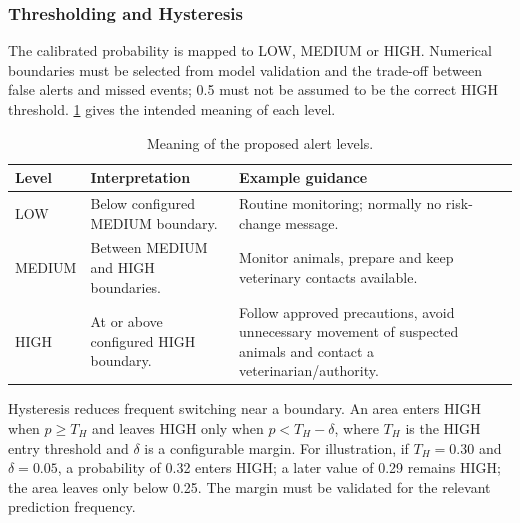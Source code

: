 \documentclass[10pt,openany]{report}
\begin{document}
\subsubsection{Thresholding and Hysteresis}
The calibrated probability is mapped to LOW, MEDIUM or HIGH. Numerical boundaries must be selected from model validation and the trade-off between false alerts and missed events; 0.5 must not be assumed to be the correct HIGH threshold. \cref{tab:alert-levels} gives the intended meaning of each level.
\begin{table}[htbp]\centering\small
\caption{Meaning of the proposed alert levels.}\label{tab:alert-levels}
\begin{tabular}{p{1.6cm}p{4.5cm}p{6.6cm}}\toprule
\textbf{Level}&\textbf{Interpretation}&\textbf{Example guidance}\\\midrule
LOW&Below configured MEDIUM boundary.&Routine monitoring; normally no risk-change message.\\
MEDIUM&Between MEDIUM and HIGH boundaries.&Monitor animals, prepare and keep veterinary contacts available.\\
HIGH&At or above configured HIGH boundary.&Follow approved precautions, avoid unnecessary movement of suspected animals and contact a veterinarian/authority.\\\bottomrule
\end{tabular}\end{table}

Hysteresis reduces frequent switching near a boundary. An area enters HIGH when $p\geq T_H$ and leaves HIGH only when $p<T_H-\delta$, where $T_H$ is the HIGH entry threshold and $\delta$ is a configurable margin. For illustration, if $T_H=0.30$ and $\delta=0.05$, a probability of 0.32 enters HIGH; a later value of 0.29 remains HIGH; the area leaves only below 0.25. The margin must be validated for the relevant prediction frequency.
\end{document}
